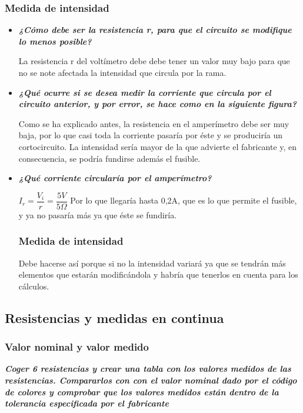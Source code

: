 	\subsubsection{Medida de intensidad}
		\begin{itemize}
			\item \textbf{\textit{¿Cómo debe ser la resistencia r, para que el circuito se modifique lo menos posible?}}
			
			La resistencia r del voltímetro debe debe tener un valor muy bajo
			para que no se note afectada la intensidad que circula por la rama.
			
			\item \textbf{\textit{¿Qué ocurre si se desea medir la corriente que circula por el circuito anterior, y por error, se hace
					como en la siguiente figura?}}
			
			Como se ha explicado antes, la resistencia en el amperímetro debe ser muy baja, por lo que casi toda la corriente pasaría por éste y se produciría un cortocircuito. La
			intensidad sería mayor de la que advierte el fabricante y, en consecuencia, se podría fundirse además el fusible.
			
			\item \textbf{\textit{¿Qué corriente circularía por el amperímetro?}}
			
			$ I_{r} = \dfrac{V_{i}}{r} = \dfrac{5V}{5\Omega} $ \hspace{5pt} {\fboxrule=1pt \fboxsep=6pt
				} Por lo que llegaría hasta 0,2A, que es lo que permite el fusible, y ya no pasaría más ya que éste se fundiría.
			
			\subsubsection{Medida de intensidad}
			Debe hacerse así porque si no la intensidad variará ya que se tendrán más elementos que estarán modificándola y habría que tenerlos en cuenta para los cálculos.
			
		\end{itemize}
\newpage

\subsection{Resistencias y medidas en continua}
\subsubsection{Valor nominal y valor medido}
\textbf{\textit{Coger 6 resistencias y crear una tabla con los valores medidos de las resistencias. Compararlos con
	con el valor nominal dado por el código de colores y comprobar que los valores medidos están dentro
	de la tolerancia especificada por el fabricante}}

